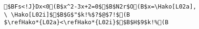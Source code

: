 \begin{verbatim}
$BFs<!J}Dx<0(B$x^2-3x+2=0$$B$N2r$O(B$x=\Hako[L02a],
\ \Hako[L02i]$$B$G$"$k!%$?$@$7!$(B
$\refHako*{L02a}<\refHako*{L02i}$$B$H$9$k!%(B
\end{verbatim}
